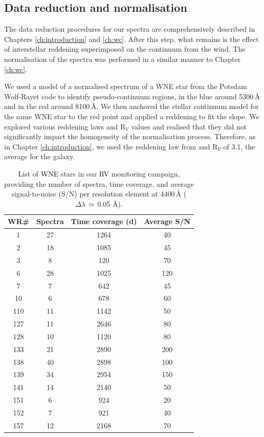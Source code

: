 \subsection{Data reduction and normalisation}
The data reduction procedures for our spectra are comprehensively described in Chapters \ref{ch:introduction} and \ref{ch:wc}. After this step, what remains is the effect of interstellar reddening superimposed on the continuum from the wind. The normalisation of the spectra was performed in a similar manner to Chapter \ref{ch:wc}.

We used a model of a normalised spectrum of a WNE star from the Potsdam Wolf-Rayet code \citep[PoWR:][]{grafener_line-blanketed_2002,hamann_temperature_2003,2004HamannGrafenerWN,2015TodtWNmodels} to identify pseudo-continuum regions, in the blue around 5300\,\r{A} and in the red around 8100\,\r{A}. We then anchored the stellar continuum model for the same WNE star to the red point and applied a reddening to fit the slope. We explored various reddening laws and R$_V$ values and realised that they did not significantly impact the homogeneity of the normalisation process. Therefore, as in Chapter \ref{ch:introduction}, we used the reddening law from \citet{2004Fitzpatrick} and R$_V$ of 3.1, the average for the galaxy.

\begin{table}
\centering
\caption{List of WNE stars in our RV monitoring campaign, providing the number of spectra, time coverage, and average signal-to-noise (S/N) per resolution element at 4400\,\r{A} ($\Delta\lambda\,\simeq\,$0.05 \r{A}).}
\begin{tabular}{cccc}
\hline \hline
WR\#&Spectra&Time coverage (d)&Average S/N \\ \hline
1&27&1264&40 \\
2&18&1085&45 \\
3&8&120&70 \\
6&28&1025&120 \\
7&7&642&45 \\
10&6&678&60 \\
110&11&1142&50 \\
127&11&2646&80 \\
128&10&1120&80 \\
133&21&2890&200 \\
138&40&2898&100 \\
139&34&2954&150 \\
141&14&2140&50 \\
151&6&924&20 \\
152&7&921&40 \\
157&12&2168&70 \\ \hline

\end{tabular}
\label{tab:wr_epochs}
\end{table}

